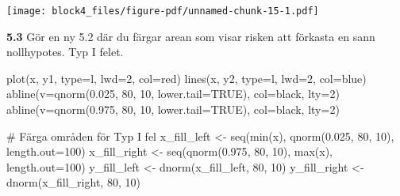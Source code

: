 \documentclass[
  letterpaper,
  DIV=11,
  numbers=noendperiod]{scrartcl}
\newenvironment{Shaded}{\begin{snugshade}}{\end{snugshade}}
\newcommand{\AttributeTok}[1]{\textcolor[rgb]{0.40,0.45,0.13}{#1}}
\newcommand{\CommentTok}[1]{\textcolor[rgb]{0.37,0.37,0.37}{#1}}
\newcommand{\ConstantTok}[1]{\textcolor[rgb]{0.56,0.35,0.01}{#1}}
\newcommand{\DecValTok}[1]{\textcolor[rgb]{0.68,0.00,0.00}{#1}}
\newcommand{\FloatTok}[1]{\textcolor[rgb]{0.68,0.00,0.00}{#1}}
\newcommand{\FunctionTok}[1]{\textcolor[rgb]{0.28,0.35,0.67}{#1}}
\newcommand{\NormalTok}[1]{\textcolor[rgb]{0.00,0.23,0.31}{#1}}
\newcommand{\OtherTok}[1]{\textcolor[rgb]{0.00,0.23,0.31}{#1}}
\newcommand{\StringTok}[1]{\textcolor[rgb]{0.13,0.47,0.30}{#1}}
\begin{document}
\texttt{[image: block4\_files/figure-pdf/unnamed-chunk-15-1.pdf]}

\textbf{5.3} Gör en ny 5.2 där du färgar arean som visar risken att
förkasta en sann nollhypotes. Typ I felet.

\begin{Shaded}
\begin{Highlighting}[]
\FunctionTok{plot}\NormalTok{(x, y1, }\AttributeTok{type=}\StringTok{\textquotesingle{}l\textquotesingle{}}\NormalTok{, }\AttributeTok{lwd=}\DecValTok{2}\NormalTok{, }\AttributeTok{col=}\StringTok{\textquotesingle{}red\textquotesingle{}}\NormalTok{)}
\FunctionTok{lines}\NormalTok{(x, y2, }\AttributeTok{type=}\StringTok{\textquotesingle{}l\textquotesingle{}}\NormalTok{, }\AttributeTok{lwd=}\DecValTok{2}\NormalTok{, }\AttributeTok{col=}\StringTok{\textquotesingle{}blue\textquotesingle{}}\NormalTok{)}
\FunctionTok{abline}\NormalTok{(}\AttributeTok{v=}\FunctionTok{qnorm}\NormalTok{(}\FloatTok{0.025}\NormalTok{, }\DecValTok{80}\NormalTok{, }\DecValTok{10}\NormalTok{, }\AttributeTok{lower.tail=}\ConstantTok{TRUE}\NormalTok{), }\AttributeTok{col=}\StringTok{\textquotesingle{}black\textquotesingle{}}\NormalTok{, }\AttributeTok{lty=}\DecValTok{2}\NormalTok{)}
\FunctionTok{abline}\NormalTok{(}\AttributeTok{v=}\FunctionTok{qnorm}\NormalTok{(}\FloatTok{0.975}\NormalTok{, }\DecValTok{80}\NormalTok{, }\DecValTok{10}\NormalTok{, }\AttributeTok{lower.tail=}\ConstantTok{TRUE}\NormalTok{), }\AttributeTok{col=}\StringTok{\textquotesingle{}black\textquotesingle{}}\NormalTok{, }\AttributeTok{lty=}\DecValTok{2}\NormalTok{)}

\CommentTok{\# Färga områden för Typ I fel}
\NormalTok{x\_fill\_left }\OtherTok{\textless{}{-}} \FunctionTok{seq}\NormalTok{(}\FunctionTok{min}\NormalTok{(x), }\FunctionTok{qnorm}\NormalTok{(}\FloatTok{0.025}\NormalTok{, }\DecValTok{80}\NormalTok{, }\DecValTok{10}\NormalTok{), }\AttributeTok{length.out=}\DecValTok{100}\NormalTok{)}
\NormalTok{x\_fill\_right }\OtherTok{\textless{}{-}} \FunctionTok{seq}\NormalTok{(}\FunctionTok{qnorm}\NormalTok{(}\FloatTok{0.975}\NormalTok{, }\DecValTok{80}\NormalTok{, }\DecValTok{10}\NormalTok{), }\FunctionTok{max}\NormalTok{(x), }\AttributeTok{length.out=}\DecValTok{100}\NormalTok{)}
\NormalTok{y\_fill\_left }\OtherTok{\textless{}{-}} \FunctionTok{dnorm}\NormalTok{(x\_fill\_left, }\DecValTok{80}\NormalTok{, }\DecValTok{10}\NormalTok{)}
\NormalTok{y\_fill\_right }\OtherTok{\textless{}{-}} \FunctionTok{dnorm}\NormalTok{(x\_fill\_right, }\DecValTok{80}\NormalTok{, }\DecValTok{10}\NormalTok{)}


\end{Highlighting}
\end{Shaded}
\end{document}
